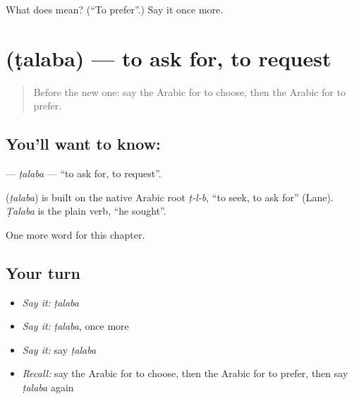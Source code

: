 \begin{tcolorbox}[breakable,colback=teal!4,colframe=teal!35!black,title={Before you move on}]
What does  mean? (\textquotedblleft{}To prefer\textquotedblright{}.) Say it once more.
\end{tcolorbox}
\section[\texorpdfstring{\ar{طلب} (ṭalaba)}{طلب (ṭalaba)}]{ (ṭalaba) — to ask for, to request}

\label{lesson:AR-C115-talaba}



\begin{quote}
Before the new one: say the Arabic for to choose, then the Arabic for to prefer.
\end{quote}

\subsection*{You'll want to know: }
\textbf{} — \emph{ṭalaba} — \textquotedblleft{}to ask for, to request\textquotedblright{}.

\begin{cousinweb}
\textbf{} (\emph{ṭalaba}) is built on the native Arabic root \emph{ṭ-l-b}, \textquotedblleft{}to seek, to ask for\textquotedblright{} (Lane). \emph{Ṭalaba} is the plain verb, \textquotedblleft{}he sought\textquotedblright{}.
\end{cousinweb}

\begin{grammarlens}[title={What you've built}]
One more word for this chapter.
\end{grammarlens}

\subsection*{Your turn}
\begin{itemize}
\raggedright
  \item \emph{Say it:} \emph{ṭalaba}
  \item \emph{Say it:} \emph{ṭalaba}, once more
  \item \emph{Say it:} say \emph{ṭalaba}
  \item \emph{Recall:} say the Arabic for to choose, then the Arabic for to prefer, then say \emph{ṭalaba} again
\end{itemize}

